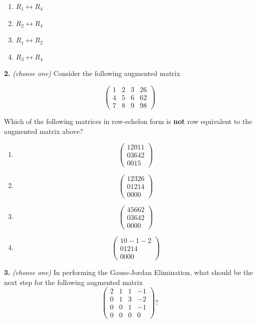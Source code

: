 \documentclass[10pt,a4paper]{article}
\begin{document}
\begin{enumerate}[label=(\Alph*)]
\item \(R_1\leftrightarrow R_4\)
\item \(R_2\leftrightarrow R_4\)
\item \(R_1\leftrightarrow R_2\)
\item \(R_3\leftrightarrow R_4\)
\end{enumerate}
\smallskip
\textbf{2.} \textit{(choose one)} Consider the following augmented matrix

\[\left(\begin{array}{ccc|c} 1&2&3&26\\ 4&5&6&62\\ 7&8&9&98 \end{array}\right)\]

Which of the following matrices in row-echelon form is \textbf{not} row equivalent to the augmented matrix above?

\begin{enumerate}[label=(\Alph*)]
\item \[\left(\begin{array}{ccc|c} 12011\\03642\\0015\end{array}\right)\]
\item \[\left(\begin{array}{ccc|c}12326\\01214\\0000\end{array}\right)\]
\item \[\left(\begin{array}{ccc|c}45662\\03642\\0000\end{array}\right)\]
\item \[\left(\begin{array}{ccc|c}10-1-2\\01214\\0000\end{array}\right)\]
\end{enumerate}
\smallskip
\textbf{3.} \textit{(choose one)} In performing the Gauss-Jordan Elimination, what should be the next step for the following augmented matrix \[\left(\begin{array}{ccc|c}      2&1&1&-1\\      0&1&3&-2\\      0&0&1&-1\\      0&0&0&0 \end{array}\right)?\]
\end{document}
